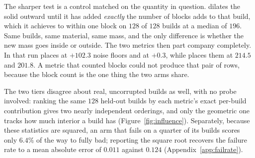 The sharper test is a control matched on the quantity in question. \growshell{} dilates the
solid outward until it has added \emph{exactly} the number of blocks \solidify{} adds to
that build, which it achieves to within one block on $128$ of $128$ builds at a median of
$196$. Same builds, same material, same mass, and the only difference is whether the new
mass goes inside or outside. The two metrics then part company completely. In that run
\mvkid{} places \growshell{} at $\mathbf{+102.3}$ noise floors and \solidify{} at
$\mathbf{+0.3}$, while \vkid{} places them at $214.5$ and $201.8$. A metric that counted
blocks could not produce that pair of rows, because the block count is the one thing the
two arms share.

The two tiers disagree about real, uncorrupted builds as well, with no probe involved: ranking the same $128$ held-out builds
by each metric's exact per-build contribution gives two nearly independent orderings, and
only the geometric one tracks how much interior a build has (Figure~\ref{fig:influence}).
Separately, because these statistics are squared, an arm that fails on a quarter of its
builds scores only $6.4\%$ of the way to fully bad; reporting the square root recovers the
failure rate to a mean absolute error of $0.011$ against $0.124$
(Appendix~\ref{app:failrate}).



